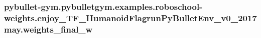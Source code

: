\subsubsection[{\texorpdfstring{weights\+\_\+final\+\_\+w}{weights_final_w}}]{\setlength{\rightskip}{0pt plus 5cm}pybullet-\/gym.\+pybulletgym.\+examples.\+roboschool-\/weights.\+enjoy\+\_\+\+T\+F\+\_\+\+Humanoid\+Flagrun\+Py\+Bullet\+Env\+\_\+v0\+\_\+2017may.\+weights\+\_\+final\+\_\+w}\hypertarget{namespacepybullet-gym_1_1pybulletgym_1_1examples_1_1roboschool-weights_1_1enjoy___t_f___humanoid5ce30284d6415ebf8c921e22a512fe3a_ac6978b8d447f9cb022a26bad2cced2e5}{}\label{namespacepybullet-gym_1_1pybulletgym_1_1examples_1_1roboschool-weights_1_1enjoy___t_f___humanoid5ce30284d6415ebf8c921e22a512fe3a_ac6978b8d447f9cb022a26bad2cced2e5}
